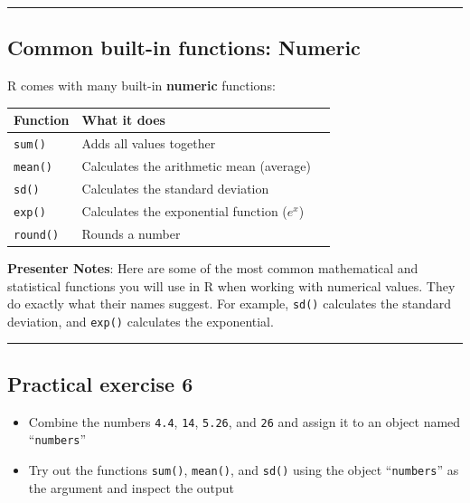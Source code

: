\documentclass[
  letterpaper,
  DIV=11,
  numbers=noendperiod]{scrartcl}
\newcounter{none} %
\providecommand{\tightlist}{%
  \setlength{\itemsep}{0pt}\setlength{\parskip}{0pt}}
\begin{document}
\begin{center}\rule{0.5\linewidth}{0.5pt}\end{center}

\subsection{Common built-in functions:
Numeric}\label{common-built-in-functions-numeric}

R comes with many built-in \textbf{numeric} functions:

{\def\LTcaptype{none} %
\begin{longtable}[]{@{}lll@{}}
\toprule\noalign{}
Function & What it does & \\
\midrule\noalign{}
\endhead
\bottomrule\noalign{}
\endlastfoot
\texttt{sum()} & Adds all values together & \\
\texttt{mean()} & Calculates the arithmetic mean (average) & \\
\texttt{sd()} & Calculates the standard deviation & \\
\texttt{exp()} & Calculates the exponential function (\(e^x\)) & \\
\texttt{round()} & Rounds a number & \\
\end{longtable}
}

\textbf{Presenter Notes}: Here are some of the most common mathematical
and statistical functions you will use in R when working with numerical
values. They do exactly what their names suggest. For example,
\texttt{sd()} calculates the standard deviation, and \texttt{exp()}
calculates the exponential.

\begin{center}\rule{0.5\linewidth}{0.5pt}\end{center}

\subsection{Practical exercise 6}\label{practical-exercise-6}

\begin{itemize}
\tightlist
\item[$\square$]
  Combine the numbers \texttt{4.4}, \texttt{14}, \texttt{5.26}, and
  \texttt{26} and assign it to an object named ``\texttt{numbers}''
\item[$\square$]
  Try out the functions \texttt{sum()}, \texttt{mean()}, and
  \texttt{sd()} using the object ``\texttt{numbers}'' as the argument
  and inspect the output
\end{itemize}
\end{document}
